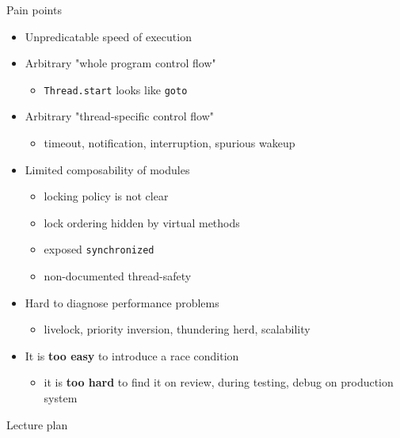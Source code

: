 \newcommand{\painpointsslide}{
\begin{frame}{Pain points}

\begin{itemize}
  \item Unpredicatable speed of execution
  \item Arbitrary "whole program control flow"
  \begin{itemize}
    \item \texttt{Thread.start} looks like \texttt{goto}
  \end{itemize}
  \item Arbitrary "thread-specific control flow"
  \begin{itemize}
    \item timeout, notification, interruption, spurious wakeup
  \end{itemize}

  \item Limited composability of modules 
  \begin{itemize}
    \item locking policy is not clear
    \item lock ordering hidden by virtual methods
    \item exposed \texttt{synchronized}
    \item non-documented thread-safety    
  \end{itemize}

  \item Hard to diagnose performance problems 
  \begin{itemize}
    \item livelock, priority inversion, thundering herd, scalability 
  \end{itemize}

  \item It is \textbf{too easy} to introduce a race condition
  \begin{itemize}
    \item it is \textbf{too hard} to find it on review, during testing, debug on production system
  \end{itemize}
\end{itemize}
\end{frame}  
}

\painpointsslide



\begin{frame}{Lecture plan}
\tableofcontents
\end{frame}


